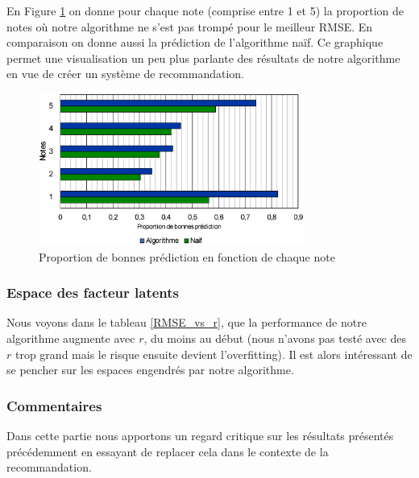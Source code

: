 \documentclass[10pt,a4paper]{article}
\begin{document}
En Figure \ref{graph_best} on donne pour chaque note (comprise entre 1 et 5) la proportion de notes où notre algorithme ne s'est pas trompé pour le meilleur RMSE. En comparaison on donne aussi la prédiction de l'algorithme naïf. Ce graphique permet une visualisation un peu plus parlante des résultats de notre algorithme en vue de créer un système de recommandation. 

\begin{figure}[ht!]
\begin{center}
\includegraphics[height=5cm]{fig/graph_best.eps}
\caption{\label{graph_best} Proportion de bonnes prédiction en fonction de chaque note}
\end{center}
\end{figure}


\subsubsection*{Espace des facteur latents}

Nous voyons dans le tableau \ref{RMSE_vs_r}, que la performance de notre algorithme augmente avec $r$, du moins au début (nous n'avons pas testé avec des $r$ trop grand mais le risque ensuite devient l'overfitting). Il est alors intéressant de se pencher sur les espaces engendrés par notre algorithme. 


\subsubsection*{Commentaires}

Dans cette partie nous apportons un regard critique sur les résultats présentés précédemment en essayant de replacer cela dans le contexte de la recommandation. 
\end{document}
